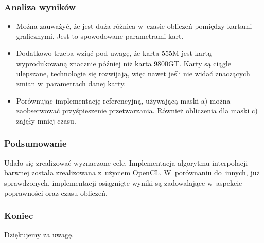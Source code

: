 \documentclass{beamer}
\begin{document}
\begin{frame}
  \frametitle{Analiza wyników}
\begin{itemize}
	\item Można zauważyć, że jest duża różnica w~czasie obliczeń pomiędzy kartami graficznymi. Jest to spowodowane parametrami kart.
	\item Dodatkowo trzeba wziąć pod uwagę, że karta 555M jest kartą wyprodukowaną znacznie później niż karta 9800GT. Karty są ciągle ulepszane, technologie się rozwijają, więc nawet jeśli nie widać znaczących zmian w~parametrach danej karty.

	\item Porównując implementację referencyjną, używającą maski a) można zaobserwować przyśpieszenie przetwarzania. Również obliczenia dla maski c) zajęły mniej czasu.
\end{itemize}
\end{frame}

\begin{frame}
  \frametitle{Podsumowanie}
  Udało się zrealizować wyznaczone cele. Implementacja algorytmu interpolacji barwnej została zrealizowana z~użyciem OpenCL. W~porównaniu do~innych, już sprawdzonych, implementacji osiągnięte wyniki są zadowalające w~aspekcie poprawności oraz czasu obliczeń.
\end{frame}

\begin{frame}
  \frametitle{Koniec}
\begin{center}
Dziękujemy za uwagę.
\end{center}
\end{frame}
\end{document}
